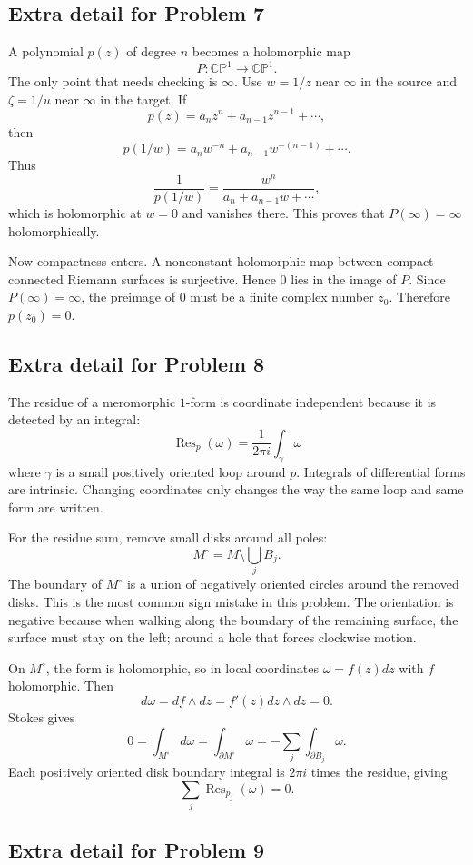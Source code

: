 \documentclass[11pt]{article}
\newcommand{\CP}{\mathbb{CP}}
\newcommand{\Res}{\operatorname{Res}}
\begin{document}
\subsection*{Extra detail for Problem 7}

A polynomial $p(z)$ of degree $n$ becomes a holomorphic map
\[
 P:\CP^1\to\CP^1.
\]
The only point that needs checking is $\infty$. Use $w=1/z$ near $\infty$ in the source and $\zeta=1/u$ near $\infty$ in the target. If
\[
 p(z)=a_nz^n+a_{n-1}z^{n-1}+\cdots,
\]
then
\[
 p(1/w)=a_nw^{-n}+a_{n-1}w^{-(n-1)}+\cdots.
\]
Thus
\[
 \frac{1}{p(1/w)}
 =
 \frac{w^n}{a_n+a_{n-1}w+\cdots},
\]
which is holomorphic at $w=0$ and vanishes there. This proves that $P(\infty)=\infty$ holomorphically.

Now compactness enters. A nonconstant holomorphic map between compact connected Riemann surfaces is surjective. Hence $0$ lies in the image of $P$. Since $P(\infty)=\infty$, the preimage of $0$ must be a finite complex number $z_0$. Therefore $p(z_0)=0$.

\subsection*{Extra detail for Problem 8}

The residue of a meromorphic $1$-form is coordinate independent because it is detected by an integral:
\[
 \Res_p(\omega)=\frac{1}{2\pi i}\int_{\gamma}\omega
\]
where $\gamma$ is a small positively oriented loop around $p$. Integrals of differential forms are intrinsic. Changing coordinates only changes the way the same loop and same form are written.

For the residue sum, remove small disks around all poles:
\[
 M^\circ=M\setminus\bigcup_j B_j.
\]
The boundary of $M^\circ$ is a union of negatively oriented circles around the removed disks. This is the most common sign mistake in this problem. The orientation is negative because when walking along the boundary of the remaining surface, the surface must stay on the left; around a hole that forces clockwise motion.

On $M^\circ$, the form is holomorphic, so in local coordinates $\omega=f(z)dz$ with $f$ holomorphic. Then
\[
 d\omega=df\wedge dz=f'(z)dz\wedge dz=0.
\]
Stokes gives
\[
 0=\int_{M^\circ}d\omega=\int_{\partial M^\circ}\omega
 =-\sum_j\int_{\partial B_j}\omega.
\]
Each positively oriented disk boundary integral is $2\pi i$ times the residue, giving
\[
 \sum_j\Res_{p_j}(\omega)=0.
\]

\subsection*{Extra detail for Problem 9}
\end{document}
